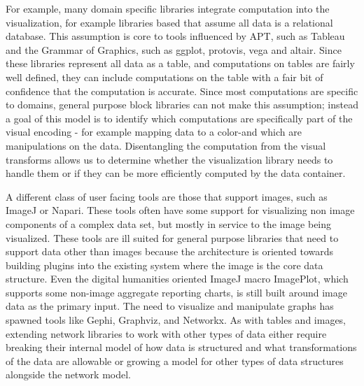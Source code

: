 \documentclass[../main.tex]{subfiles}
\begin{document}
For example, many domain specific libraries integrate computation into the visualization, for example libraries based that assume all data is a relational database. This assumption is core to tools influenced by APT, such as Tableau\cite{StoltePolaris2002,hanrahanVizQL2006,MackinlayShowme2007} and the Grammar of Graphics\cite{wilkinsonGrammarGraphics2005}, such as ggplot\cite{wickhamGgplot2ElegantGraphics2016a}, protovis\cite{bostockProtoviz2009}, vega\cite{satyanarayanDeclarativeInteractionDesign2014} and altair\cite{vanderplasAltairInteractiveStatistical2018}. Since these libraries represent all data as a table, and computations on tables are fairly well defined\cite{ullmanFirstCourseDatabase2008}, they can include computations on the table with a fair bit of confidence that the computation is accurate. Since most computations are specific to domains, general purpose block libraries can not make this assumption; instead a goal of this model is to identify which computations are specifically part of the visual encoding - for example mapping data to a color-and which are manipulations on the data. Disentangling the computation from the visual transforms allows us to determine whether the visualization library needs to handle them or if they can be more efficiently computed by the data container.


A different class of user facing tools are those that support images, such as ImageJ\cite{schneiderNIHImageImageJ2012} or Napari\cite{nicholas_sofroniew_2021_4533308}. These tools often have some support for visualizing non image components of a complex data set, but mostly in service to the image being visualized. These tools are ill suited for general purpose libraries that need to support data other than images because the architecture is oriented towards building plugins into the existing system \cite{WritingPlugins} where the image is the core data structure. Even the digital humanities oriented ImageJ macro ImagePlot\cite{studiesCulturevisImageplot2021}, which supports some non-image aggregate reporting charts, is still built around image data as the primary input. The need to visualize and manipulate graphs has spawned tools like Gephi\cite{bastianGephiOpenSource2009}, Graphviz\cite{ellsonGraphvizOpenSource2002}, and Networkx\cite{HagbergExploringNetwork2008}. As with tables and images, extending network libraries to work with other types of data either require breaking their internal model of how data is structured and what transformations of the data are allowable or growing a model for other types of data structures alongside the network model. 
\end{document}
